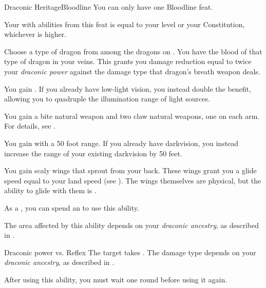     \begin{feat}{Draconic Heritage}{Bloodline}
         You can only have one Bloodline feat.
        \featben

         Your  with abilities from this feat is equal to your level or your Constitution, whichever is higher.

         Choose a type of dragon from among the dragons on .
        You have the blood of that type of dragon in your veins.
        This grants you damage reduction equal to twice your \textit{draconic power} against the damage type that dragon's breath weapon deals.

         You gain .
        If you already have low-light vision, you instead double the benefit, allowing you to quadruple the illumination range of light sources.

         You gain a bite natural weapon and two claw natural weapons, one on each arm.
        For details, see .

         You gain  with a 50 foot range.
        If you already have darkvision, you instead increase the range of your existing darkvision by 50 feet.

         You gain scaly wings that sprout from your back.
        These wings grant you a glide speed equal to your land speed (see ).
        The wings themselves are physical, but the ability to glide with them is .

         As a , you can spend an  to use this ability.
        \begin{ability}
            \begin{spelltargetinginfo}
                \spellspecial The area affected by this ability depends on your \textit{draconic ancestry}, as described in .
            \end{spelltargetinginfo}
            \begin{spelleffects}
                \begin{spellattack}{Draconic power vs. Reflex}
                    \spellsuccess The target takes .
                    The damage type depends on your \textit{draconic ancestry}, as described in .
                \end{spellattack}
                \spellspecial After using this ability, you must wait one round before using it again.
            \end{spelleffects}
        \end{ability}


\end{feat}
